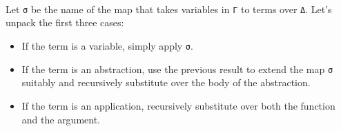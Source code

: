 \begin{fence}
\begin{code}
\AgdaSpace{}%
\AgdaSymbol{(}\AgdaSymbol{)}%
\>[23]\AgdaSymbol{=}%
\>[26]\<%
\\
\>[0]\AgdaSpace{}%
\AgdaSpace{}%
\AgdaSymbol{(}\AgdaSpace{}%
\AgdaSymbol{)}%
\>[23]\AgdaSymbol{=}%
\>[26]\AgdaSpace{}%
\AgdaSymbol{(}\AgdaSpace{}%
\AgdaSpace{}%
\AgdaSymbol{)}\<%
\\
\>[0]\AgdaSpace{}%
\AgdaSpace{}%
\AgdaSymbol{(}\AgdaSpace{}%
\AgdaSpace{}%
\AgdaSpace{}%
\AgdaSymbol{)}%
\>[23]\AgdaSymbol{=}%
\>[26]\AgdaSpace{}%
\AgdaSymbol{(}\AgdaSpace{}%
\AgdaSpace{}%
\AgdaSymbol{)}\AgdaSpace{}%
\AgdaSymbol{(}\AgdaSpace{}%
\AgdaSpace{}%
\AgdaSymbol{)}\AgdaSpace{}%
\AgdaSymbol{(}\AgdaSpace{}%
\AgdaSymbol{(}\AgdaSpace{}%
\AgdaSymbol{)}\AgdaSpace{}%
\AgdaSymbol{)}\<%
\\
\>[0]\AgdaSpace{}%
\AgdaSpace{}%
\AgdaSymbol{(}\AgdaSpace{}%
\AgdaSymbol{)}%
\>[23]\AgdaSymbol{=}%
\>[26]\AgdaSpace{}%
\AgdaSymbol{(}\AgdaSpace{}%
\AgdaSymbol{(}\AgdaSpace{}%
\AgdaSymbol{)}\AgdaSpace{}%
\AgdaSymbol{)}\<%
\end{code}
\end{fence}

Let \texttt{σ} be the name of the map that takes variables in \texttt{Γ}
to terms over \texttt{Δ}. Let's unpack the first three cases:

\begin{itemize}
\item
  If the term is a variable, simply apply \texttt{σ}.
\item
  If the term is an abstraction, use the previous result to extend the
  map \texttt{σ} suitably and recursively substitute over the body of
  the abstraction.
\item
  If the term is an application, recursively substitute over both the
  function and the argument.
\end{itemize}


